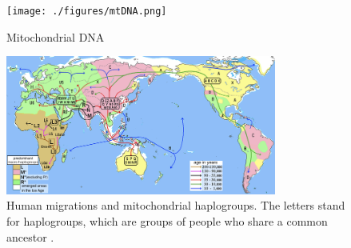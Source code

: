 \documentclass[conference]{IEEEtran}
\begin{document}
\begin{figure}[!t]
\centering
\texttt{[image: ./figures/mtDNA.png]}
\caption{Mitochondrial DNA\cite{KhanAcademy}}
\label{mtDNA}
\end{figure}

\begin{figure}[!t]
\centering
\includegraphics[width=3.5in]{./figures/Human_migrations_and_mitochondrial_haplogroups.png}
\caption{Human migrations and mitochondrial haplogroups. The letters stand for haplogroups, which are groups of people who share a common ancestor \cite{Haplogroup}.}
\label{HumanMigration}
\end{figure}




%
\IEEEpeerreviewmaketitle
\end{document}
